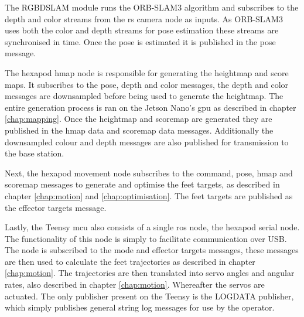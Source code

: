         The RGBDSLAM module runs the ORB-SLAM3 algorithm and subscribes to the depth and color streams from the rs camera node as inputs. As ORB-SLAM3 uses both the color and depth streams for pose estimation these streams are synchronised in time. Once the pose is estimated it is published in the pose message.

        The hexapod hmap node is responsible for generating the heightmap and score maps. It subscribes to the pose, depth and color messages, the depth and color messages are downsampled before being used to generate the heightmap. The entire generation process is ran on the Jetson Nano's \ac{gpu} as described in chapter \ref{chap:mapping}. Once the heightmap and scoremap are generated they are published in the hmap data and scoremap data messages. Additionally the downsampled colour and depth messages are also published for transmission to the base station.

        Next, the hexapod movement node subscribes to the command, pose, hmap and scoremap messages to generate and optimise the feet targets, as described in chapter \ref{chap:motion} and \ref{chap:optimisation}. The feet targets are published as the effector targets message.

        Lastly, the Teensy \ac{mcu} also consists of a single \ac{ros} node, the hexapod serial node. The functionality of this node is simply to facilitate communication over USB. The node is subscribed to the mode and effector targets messages, these messages are then used to calculate the feet trajectories as described in chapter \ref{chap:motion}. The trajectories are then translated into servo angles and angular rates, also described in chapter \ref{chap:motion}. Whereafter the servos are actuated. The only publisher present on the Teensy is the LOGDATA publisher, which simply publishes general string log messages for use by the operator.
        
